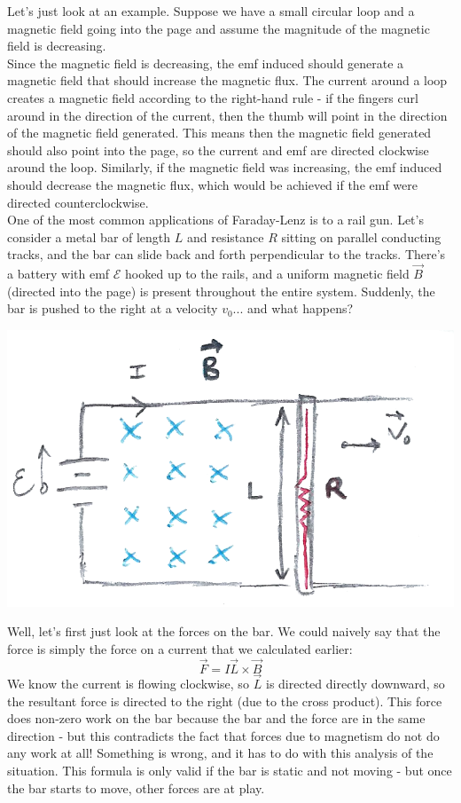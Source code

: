 Let's just look at an example. Suppose we have a small circular loop and a magnetic field going into the page and assume the magnitude of the magnetic field is decreasing.\\
Since the magnetic field is decreasing, the emf induced should generate a magnetic field that should increase the magnetic flux. The current around a loop creates a magnetic field according to the right-hand rule - if the fingers curl around in the direction of the current, then the thumb will point in the direction of the magnetic field generated. This means then the magnetic field generated should also point into the page, so the current and emf are directed clockwise around the loop. Similarly, if the magnetic field was increasing, the emf induced should decrease the magnetic flux, which would be achieved if the emf were directed counterclockwise. \\
One of the most common applications of Faraday-Lenz is to a rail gun. Let's consider a metal bar of length $L$ and resistance $R$ sitting on parallel conducting tracks, and the bar can slide back and forth perpendicular to the tracks. There's a battery with emf $\mathscr E$ hooked up to the rails, and a uniform magnetic field $\vec B$ (directed into the page) is present throughout the entire system. Suddenly, the bar is pushed to the right at a velocity $v_0$... and what happens?\\
\begin{center}
	\includegraphics[scale=0.25]{images/em/railgun.png}
\end{center}
Well, let's first just look at the forces on the bar. We could naively say that the force is simply the force on a current that we calculated earlier:
\[
	\vec F = I \vec L \times \vec B 
\]
We know the current is flowing clockwise, so $\vec L$ is directed directly downward, so the resultant force is directed to the right (due to the cross product). This force does non-zero work on the bar because the bar and the force are in the same direction - but this contradicts the fact that forces due to magnetism do not do any work at all! Something is wrong, and it has to do with this analysis of the situation. This formula is only valid if the bar is static and not moving - but once the bar starts to move, other forces are at play. 
